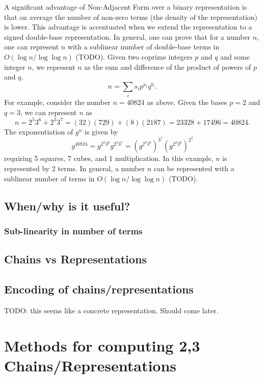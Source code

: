 \documentclass{ucalgthes1}
\theoremstyle{plain}
\theoremstyle{definition}
\begin{document}
A significant advantage of Non-Adjacent Form over a binary representation is that on average the number of non-zero terms (the density of the representation) is lower.  This advantage is accentuated when we extend the representation to a signed double-base representation.  In general, one can prove that for a number $n$, one can represent $n$ with a sublinear number of double-base terms in $O(\log n / \log \log n)$ (TODO).  Given two coprime integers $p$ and $q$ and some integer $n$, we represent $n$ as the sum and difference of the product of powers of $p$ and $q$,
\[
	n = \sum_i s_i p^{a_i} q^{b_i}.
\]
For example, consider the number $n=40824$ as above.  Given the bases $p=2$ and $q=3$, we can represent $n$ as
\[
	n = 2^5 3^6 + 2^3 3^7 = (32)(729) + (8)(2187) = 23328 + 17496 = 40824.
\]
The exponentiation of $g^n$ is given by
\[
	g^{40824} = g^{2^5 3^6} g^{2^3 3^7} = \left(g^{2^3 3^6}\right)^{3^1} \left(g^{2^3 3^6}\right)^{2^2}
\]
requiring 5 squares, 7 cubes, and 1 multiplication.  In this example, $n$ is represented by 2 terms.  In general, a number $n$ can be represented with a sublinear number of terms in $O(\log n / \log \log n)$ (TODO).



\pagebreak
\bigbreak
\subsection{When/why is it useful?}

\subsubsection {Sub-linearity in number of terms}

\bigbreak
\subsection{Chains vs Representations}


\bigbreak
\subsection{Encoding of chains/representations}
TODO: this seems like a concrete representation.  Should come later.




\bigbreak
\section{Methods for computing 2,3 Chains/Representations}\label{section:dbnsMethods}
\end{document}
